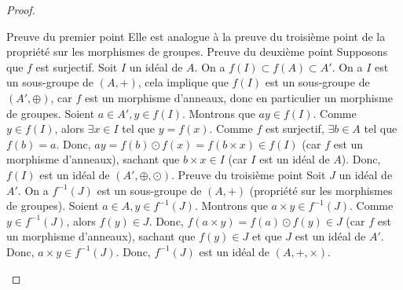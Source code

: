 \documentclass[12pt,a4paper]{report}
\begin{document}
\begin{proof}
    \begin{outline}
        \1 Preuve du premier point
            \2 Elle est analogue à la preuve du troisième point de la propriété sur les morphismes de groupes.
        \1 Preuve du deuxième point
            \2 Supposons que $f$ est surjectif. Soit $I$ un idéal de $A$.
            \2 On a $f(I)\subset f(A) \subset A'$.
            \2 On a $I$ est un sous-groupe de $(A,+)$, cela implique que $f(I)$ est un sous-groupe de $(A',\oplus)$, car $f$ est un morphisme d'anneaux, donc en particulier un morphisme de groupes.
            \2 Soient $a\in A', y\in f(I)$. Montrons que $ay \in f(I)$.
                \3 Comme $y \in f(I)$, alors $\exists x \in I$ tel que $y = f(x)$.
                \3 Comme $f$ est surjectif, $\exists b \in A$ tel que $f(b) = a$.
                \3 Donc, $a y = f(b) \odot f(x) = f(b \times x) \in f(I)$ (car $f$ est un morphisme d'anneaux), sachant que $b \times x \in I$ (car $I$ est un idéal de $A$).
            \2 Donc, $f(I)$ est un idéal de $(A',\oplus,\odot)$.
        \1 Preuve du troisième point
            \2 Soit $J$ un idéal de $A'$.
            \2 On a $f^{-1}(J)$ est un sous-groupe de $(A,+)$ (propriété sur les morphismes de groupes).
            \2 Soient $a \in A, y \in f^{-1}(J)$. Montrons que $a \times y \in f^{-1}(J)$.
                \3 Comme $y \in f^{-1}(J)$, alors $f(y) \in J$.
                \3 Donc, $f(a \times y) = f(a) \odot f(y) \in J$ (car $f$ est un morphisme d'anneaux), sachant que $f(y) \in J$ et que $J$ est un idéal de $A'$.
                \3 Donc, $a \times y \in f^{-1}(J)$.
            \2 Donc, $f^{-1}(J)$ est un idéal de $(A,+,\times)$.
    \end{outline}
\end{proof}
\end{document}
